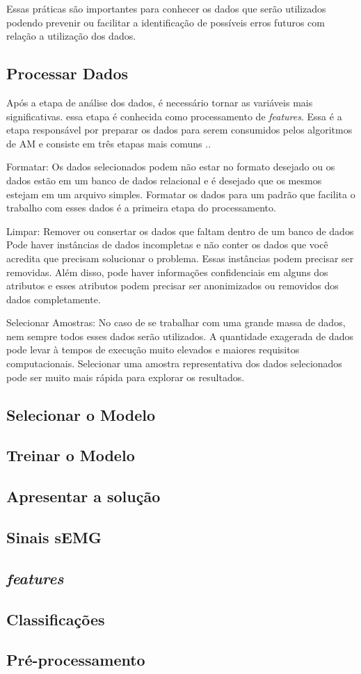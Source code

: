 Essas práticas são importantes para conhecer os dados que serão utilizados podendo prevenir ou facilitar a identificação de possíveis erros futuros com relação a utilização dos dados.

\subsection{Processar Dados}

Após a etapa de análise dos dados, é necessário tornar as variáveis mais significativas. essa etapa é conhecida como processamento de \textit{features}. Essa é a etapa responsável por preparar os dados para serem consumidos pelos algoritmos de AM e consiste em três etapas mais comuns \cite{prepareDataML}..

Formatar: Os dados selecionados podem não estar no formato desejado ou os dados estão em um banco de dados relacional e é desejado que os mesmos estejam em um arquivo simples. Formatar os dados para um padrão que facilita o trabalho com esses dados é a primeira etapa do processamento.

Limpar: Remover ou consertar os dados que faltam dentro de um banco de dados  Pode haver instâncias de dados incompletas e não conter os dados que você acredita que precisam solucionar o problema. Essas instâncias podem precisar ser removidas. Além disso, pode haver informações confidenciais em alguns dos atributos e esses atributos podem precisar ser anonimizados ou removidos dos dados completamente.

Selecionar Amostras: No caso de se trabalhar com uma grande massa de dados, nem sempre todos esses dados serão utilizados. A quantidade exagerada de dados pode levar à tempos de execução muito elevados e maiores requisitos computacionais. Selecionar uma amostra representativa dos dados selecionados pode ser muito mais rápida para explorar os resultados. 

\subsection{Selecionar o Modelo}

\subsection{Treinar o Modelo}

\subsection{Apresentar a solução}

\subsection{Sinais sEMG}
\subsection{\textit{features}}
\subsection{Classificações}
\subsection{Pré-processamento}